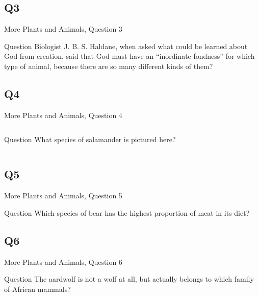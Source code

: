 \documentclass[11pt]{beamer}
\begin{document}
\subsection*{Q3}
\begin{frame}[t]{More Plants and Animals, Question 3}
\begin{block}{Question}
Biologist J. B. S. Haldane, when asked what could be learned about God from creation, said that God must have an ``inordinate fondness'' for which type of animal, because there are so many different kinds of them?
\end{block}
\end{frame}
\subsection*{Q4}
\begin{frame}[t]{More Plants and Animals, Question 4}
\begin{columns}[T,totalwidth=\linewidth]
\begin{column}{0.32\linewidth}
\begin{block}{Question}
What species of salamander is pictured here?
\end{block}
\end{column}
\begin{column}{0.65\linewidth}
\begin{center}
\texttt{[image: \{Images/axolotl]}.jpg}
\end{center}
\end{column}
\end{columns}
\end{frame}
\subsection*{Q5}
\begin{frame}[t]{More Plants and Animals, Question 5}
\begin{block}{Question}
Which species of bear has the highest proportion of meat in its diet?
\end{block}
\end{frame}
\subsection*{Q6}
\begin{frame}[t]{More Plants and Animals, Question 6}
\begin{block}{Question}
The aardwolf is not a wolf at all, but actually belongs to which family of African mammals?
\end{block}
\end{frame}
\end{document}

